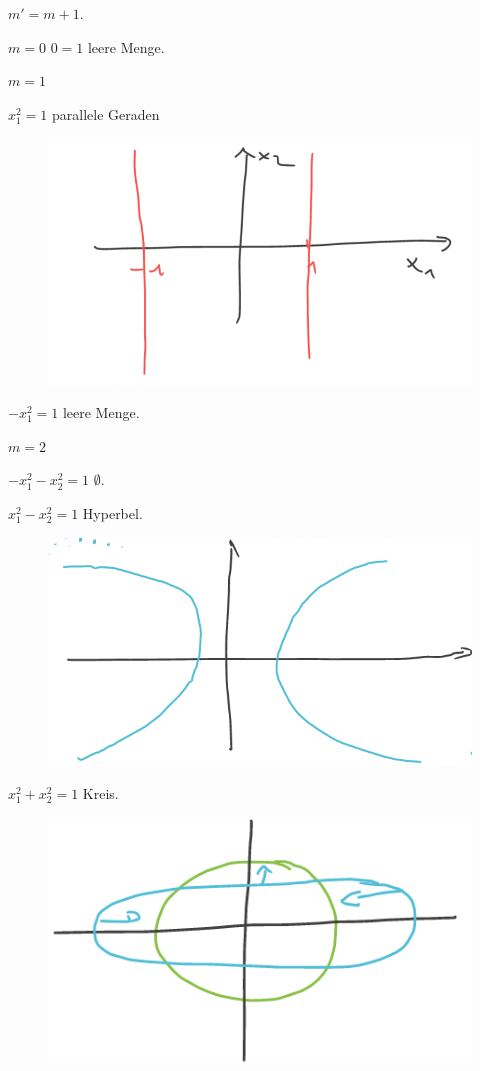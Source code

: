 \begin{eigenschaftenenumerate}
\begin{proofdescription}
\begin{figure}[H]
      \label{fig:zwei_geraden_quadrik}
    \end{figure}
  \end{proofdescription}
  \item \( m'=m+1 \).
  \begin{proofdescription}
    \item[\( m=0 \)] \tto \( 0=1 \)  \tto leere Menge.
    \item[\( m=1 \)] \begin{proofdescription}
      \item[\( x_1^2=1 \)]   parallele Geraden
      \begin{figure}[H]
        \centering
        \includegraphics[width=0.5\linewidth]{figures/parallele_geraden_quadrik}
        \label{fig:parallele_geraden_quadrik}
      \end{figure}
      \item[\( -x_1^2=1 \)] \tto leere Menge.
    \end{proofdescription}
    \item[\( m=2 \)] \begin{proofdescription}
      \item[\( -x_1^2-x_2^2=1 \)] \tto \( \emptyset \).
      \item[\( x_1^2-x_2^2=1 \)] \tto Hyperbel. 
      \begin{figure}[H]
        \centering
        \includegraphics[width=0.5\linewidth]{figures/hyperbel_quadrik}
        \label{fig:hyperbel_quadrik}
      \end{figure}
      \item[\( x_1^2+x_2^2=1 \)] \tto Kreis.
      \begin{figure}[H]
        \centering
        \includegraphics[width=0.5\linewidth]{figures/ellipse_kreis_quadrik}

\end{figure}
\end{proofdescription}
\end{proofdescription}
\end{eigenschaftenenumerate}

